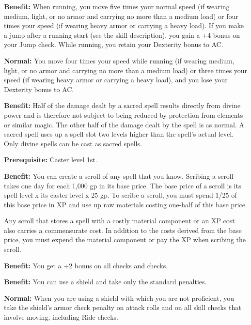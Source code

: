 
\textbf{Benefit:} When running, you move five times your normal speed (if wearing 
medium, light, or no armor and carrying no more than a medium load) or four times 
your speed (if wearing heavy armor or carrying a heavy load). If you make a jump 
after a running start (see the  skill description), you gain a +4 bonus on 
your Jump check. While running, you retain your Dexterity bonus to AC.

\textbf{Normal:} You move four times your speed while running (if wearing medium, 
light, or no armor and carrying no more than a medium load) or three times your 
speed (if wearing heavy armor or carrying a heavy load), and you lose your Dexterity 
bonus to AC.


\textbf{Benefit:} Half of the damage dealt by a sacred spell results directly from 
divine power and is therefore not subject to being reduced by protection from elements 
or similar magic. The other half of the damage dealt by the spell is as normal. 
A sacred spell uses up a spell slot two levels higher than the spell's actual level. 
Only divine spells can be cast as sacred spells.


\textbf{Prerequisite:} Caster level 1st.

\textbf{Benefit:} You can create a scroll of any spell that you know. Scribing 
a scroll takes one day for each 1,000 gp in its base price. The base price of a 
scroll is its spell level x its caster level x 25 gp. To scribe a scroll, 
you must spend 1/25 of this base price in XP and use up raw materials costing one-half 
of this base price.

Any scroll that stores a spell with a costly material component or an XP cost also 
carries a commensurate cost. In addition to the costs derived from the base price, 
you must expend the material component or pay the XP when scribing the scroll.


\textbf{Benefit:} You get a +2 bonus on all  checks and  checks.


\textbf{Benefit:} You can use a shield and take only the standard penalties.

\textbf{Normal:} When you are using a shield with which you are not proficient, 
you take the shield's armor check penalty on attack rolls and on all skill checks 
that involve moving, including Ride checks.

